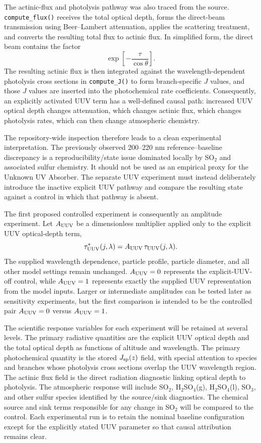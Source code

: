 \documentclass[10pt]{article}
\begin{document}
The actinic-flux and photolysis pathway was also traced from the source. \texttt{compute\_flux()} receives the total optical depth, forms the direct-beam transmission using Beer--Lambert attenuation, applies the scattering treatment, and converts the resulting total flux to actinic flux. In simplified form, the direct beam contains the factor
\[
\exp\!\left[-\frac{\tau}{\cos\theta}\right].
\]
The resulting actinic flux is then integrated against the wavelength-dependent photolysis cross sections in \texttt{compute\_J()} to form branch-specific $J$ values, and those $J$ values are inserted into the photochemical rate coefficients. Consequently, an explicitly activated UUV term has a well-defined causal path: increased UUV optical depth changes attenuation, which changes actinic flux, which changes photolysis rates, which can then change atmospheric chemistry.

The repository-wide inspection therefore leads to a clean experimental interpretation. The previously observed 200--220 nm reference--baseline discrepancy is a reproducibility/state issue dominated locally by SO$_2$ and associated sulfur chemistry. It should not be used as an empirical proxy for the Unknown UV Absorber. The separate UUV experiment must instead deliberately introduce the inactive explicit UUV pathway and compare the resulting state against a control in which that pathway is absent.

The first proposed controlled experiment is consequently an amplitude experiment. Let $A_{\rm UUV}$ be a dimensionless multiplier applied only to the explicit UUV optical-depth term,
\[
\tau_{\rm UUV}^{*}(j,\lambda)
=
A_{\rm UUV}\,\tau_{\rm UUV}(j,\lambda).
\]
The supplied wavelength dependence, particle profile, particle diameter, and all other model settings remain unchanged. $A_{\rm UUV}=0$ represents the explicit-UUV-off control, while $A_{\rm UUV}=1$ represents exactly the supplied UUV representation from the model inputs. Larger or intermediate amplitudes can be tested later as sensitivity experiments, but the first comparison is intended to be the controlled pair $A_{\rm UUV}=0$ versus $A_{\rm UUV}=1$.

The scientific response variables for each experiment will be retained at several levels. The primary radiative quantities are the explicit UUV optical depth and the total optical depth as functions of altitude and wavelength. The primary photochemical quantity is the stored $J_{\rm sp}(z)$ field, with special attention to species and branches whose photolysis cross sections overlap the UUV wavelength region. The actinic flux field is the direct radiation diagnostic linking optical depth to photolysis. The atmospheric response will include SO$_2$, H$_2$SO$_4$(g), H$_2$SO$_4$(l), SO$_3$, and other sulfur species identified by the source/sink diagnostics. The chemical source and sink terms responsible for any change in SO$_2$ will be compared to the control. Each experimental run is to retain the nominal baseline configuration except for the explicitly stated UUV parameter so that causal attribution remains clear.
\end{document}
